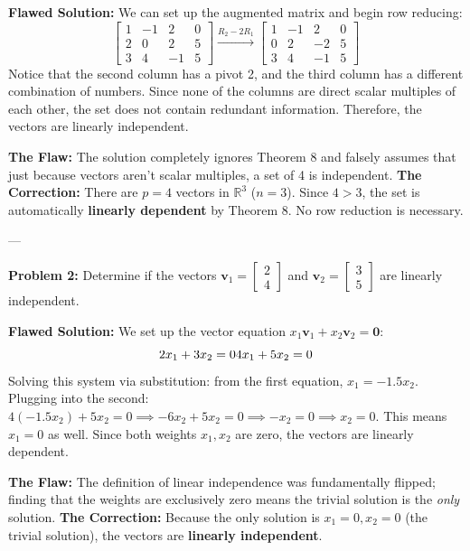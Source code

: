 \documentclass[11pt]{article}
\begin{document}
\textbf{Flawed Solution:}
We can set up the augmented matrix and begin row reducing:
\[
\begin{bmatrix}
1 & -1 & 2 & 0 \\
2 & 0 & 2 & 5 \\
3 & 4 & -1 & 5 
\end{bmatrix}
\xrightarrow{R_2 - 2R_1}
\begin{bmatrix}
1 & -1 & 2 & 0 \\
0 & 2 & -2 & 5 \\
3 & 4 & -1 & 5
\end{bmatrix}
\]
Notice that the second column has a pivot 2, and the third column has a different combination of numbers. Since none of the columns are direct scalar multiples of each other, the set does not contain redundant information. Therefore, the vectors are linearly independent.

\vspace{0.5cm}
\textbf{The Flaw:} The solution completely ignores Theorem 8 and falsely assumes that just because vectors aren't scalar multiples, a set of 4 is independent.
\textbf{The Correction:} There are $p=4$ vectors in $\mathbb{R}^3$ ($n=3$). Since $4 > 3$, the set is automatically \textbf{linearly dependent} by Theorem 8. No row reduction is necessary.

---

\textbf{Problem 2:} Determine if the vectors $\mathbf{v}_1 = \begin{bmatrix} 2 \\ 4 \end{bmatrix}$ and $\mathbf{v}_2 = \begin{bmatrix} 3 \\ 5 \end{bmatrix}$ are linearly independent.

\textbf{Flawed Solution:}
We set up the vector equation $x_1\mathbf{v}_1 + x_2\mathbf{v}_2 = \mathbf{0}$:
\[
2x_1 + 3x_2 = 0 \\
4x_1 + 5x_2 = 0
\]
Solving this system via substitution: from the first equation, $x_1 = -1.5x_2$. Plugging into the second: $4(-1.5x_2) + 5x_2 = 0 \implies -6x_2 + 5x_2 = 0 \implies -x_2 = 0 \implies x_2 = 0$. 
This means $x_1 = 0$ as well. Since both weights $x_1, x_2$ are zero, the vectors are linearly dependent.

\vspace{0.5cm}
\textbf{The Flaw:} The definition of linear independence was fundamentally flipped; finding that the weights are exclusively zero means the trivial solution is the \textit{only} solution.
\textbf{The Correction:} Because the only solution is $x_1=0, x_2=0$ (the trivial solution), the vectors are \textbf{linearly independent}.
\end{document}
